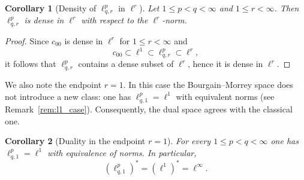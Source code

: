 \documentclass[preprint,12pt]{elsarticle}
\newtheorem{corollary}{Corollary}[theorem]
\begin{document}
\begin{corollary}[Density of $\ell^{p}_{q,r}$ in $\ell^{r}$]
\label{cor:lpqr-dense-in-lr}
Let \(1 \le p < q < \infty\) and \(1 \le r < \infty\). Then \(\ell^{p}_{q,r}\) is dense in \(\ell^{r}\) with respect to the \(\ell^{r}\)-norm.
\end{corollary}

\begin{proof}
Since $c_{00}$ is dense in $\ell^{r}$ for $1\le r<\infty$ and
\[
c_{00}\subset \ell^{1}\subset \ell^{p}_{q,r}\subset \ell^{r},
\]
it follows that $\ell^{p}_{q,r}$ contains a dense subset of $\ell^{r}$, hence it is dense in $\ell^{r}$.
\end{proof}

\medskip

We also note the endpoint $r=1$. In this case the Bourgain--Morrey space does not
introduce a new class: one has $\ell^{p}_{q,1}=\ell^{1}$ with equivalent norms
(see Remark~\ref{rem:l1_case}). Consequently, the dual space agrees with the classical one.

\begin{corollary}[Duality in the endpoint $r=1$]\label{cor:endpoint-duality}
For every $1\le p<q<\infty$ one has $\ell^{p}_{q,1}=\ell^{1}$ with equivalence of norms. In particular,
\[
(\ell^{p}_{q,1})^* = (\ell^1)^* = \ell^\infty.
\]
\end{corollary}
\end{document}
